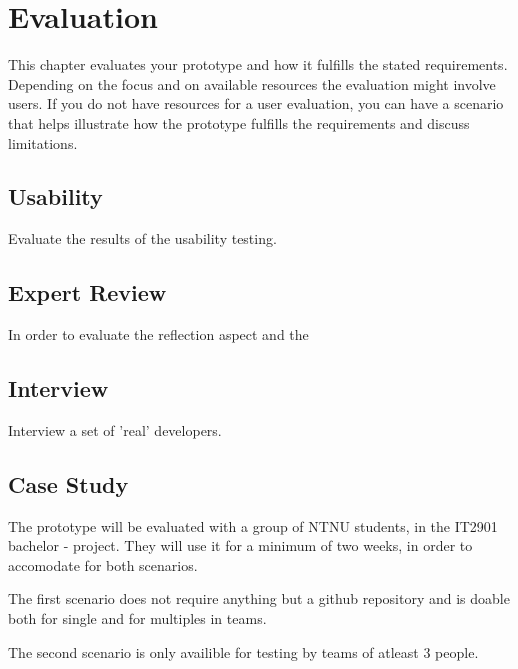 \chapter{Evaluation}
This chapter evaluates your prototype and how it fulfills the
stated requirements. Depending on the focus and on available resources
the evaluation might involve users. If you do not have resources for a user
evaluation, you can have a scenario that helps illustrate how the prototype
fulfills the requirements and discuss limitations.

\section{Usability}
Evaluate the results of the usability testing.

\section{Expert Review}
In order to evaluate the reflection aspect and the 

\section{Interview}
Interview a set of 'real' developers.

\section{Case Study}
The prototype will be evaluated with a group of NTNU students, in the IT2901 bachelor - project. They will use it for a minimum of two weeks, in order to accomodate for both scenarios.

The first scenario does not require anything but a github repository and is doable both for single and for multiples in teams.

The second scenario is only availible for testing by teams of atleast 3 people.